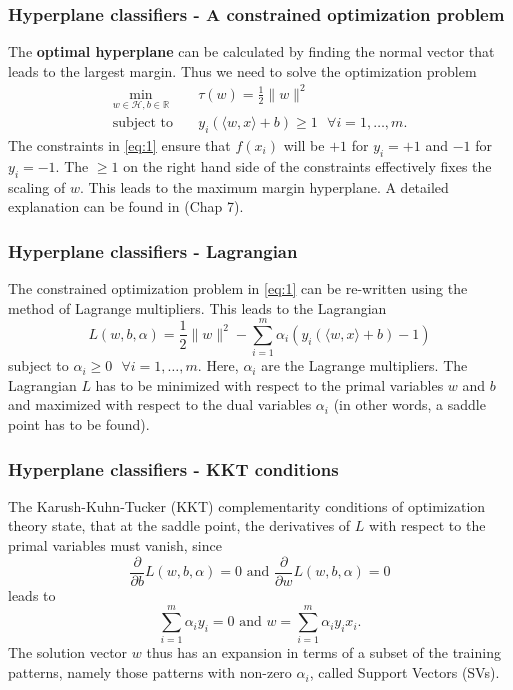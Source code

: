 \documentclass{beamer}
\begin{document}
\begin{frame}{}
    \frametitle{Hyperplane classifiers - A constrained optimization problem}
    The \textbf{optimal hyperplane} can be calculated by finding the normal vector that leads to the largest margin. Thus we need to solve the optimization problem
    \begin{equation} \label{eq:1}
        \begin{aligned}
            \min_{w \in \mathcal{H}, b \in \mathbb{R}} \quad & \tau (w) = \frac{1}{2} \lVert w \rVert^2 \\
            \textrm{subject to} \quad & y_{i} \left( \langle w,x \rangle + b \right) \geq 1 \text{ } \forall i = {1, \dots, m}. 
        \end{aligned}
    \end{equation}
    The constraints in \eqref{eq:1} ensure that $f(x_i)$ will be $+1$ for $y_i = +1$ and $-1$ for  $y_i = -1$. The $\geq 1$ on the right hand side of the constraints effectively fixes the scaling of $w$. This leads to the maximum margin hyperplane. A detailed explanation can be found in \cite{Schoelkopf}(Chap 7).
\end{frame}


\begin{frame}{}
    \frametitle{Hyperplane classifiers - Lagrangian}
    The constrained optimization problem in \eqref{eq:1} can be re-written using the method of Lagrange multipliers. This leads to the Lagrangian
    \begin{equation} \label{eq:2}
        L(w,b,\alpha) = \frac{1}{2} \lVert w \rVert^2 - \sum_{i=1}^{m} \alpha_i \left( y_{i} \left( \langle w,x \rangle + b \right) - 1 \right)
    \end{equation}
    subject to $\alpha_i \geq 0 \text{ } \forall i = {1, \dots, m}$. Here, $\alpha_i$ are the Lagrange multipliers. The Lagrangian $L$ has to be minimized with respect to the primal variables $w$ and $b$ and maximized with respect to the dual variables $\alpha_i$ (in other words, a saddle point has to be found).
\end{frame}


\begin{frame}{}
    \frametitle{Hyperplane classifiers - KKT conditions}
    The Karush-Kuhn-Tucker (KKT) complementarity conditions of optimization theory state, that at the saddle point, the derivatives of $L$ with respect to the
    primal variables must vanish, since
    \begin{equation}
        \frac{\partial}{\partial b} L(w,b,\alpha) = 0 \text{ and } \frac{\partial}{\partial w} L(w,b,\alpha) = 0
    \end{equation}
    leads to
    \begin{equation} \label{eq:3}
        \sum_{i=1}^{m} \alpha_i y_i = 0 \text{ and } w = \sum_{i=1}^{m} \alpha_i y_i x_i.
    \end{equation}
    The solution vector $w$ thus has an expansion in terms of a subset of the training patterns, namely those patterns with non-zero $\alpha_i$, called Support Vectors (SVs).
\end{frame}
\end{document}
